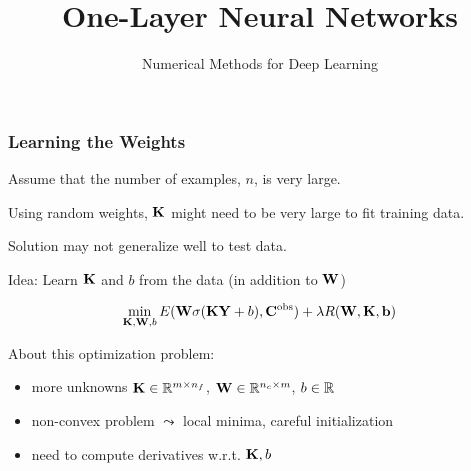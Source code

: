 \documentclass[12pt,fleqn,handout]{beamer}
\title{ One-Layer Neural Networks}
\subtitle{Numerical Methods for Deep Learning}
\date{
}
\begin{document}
\makebeamertitle



\begin{frame}[fragile]\frametitle{Learning the Weights}

Assume that the number of examples, $n$, is very large.

Using random weights, ${\bf K}$ might need to be very large to fit training data.

Solution may not generalize well to test data.

\bigskip
\pause

Idea: Learn ${\bf K}$ and $b$  from the data (in addition to ${\bf W}$)

$$ \min_{{\bf K},{\bf W},b} E({\bf W}\sigma({\bf K} {\bf Y} + b), {\bf C}^{\rm obs}) + \lambda R({\bf W},{\bf K},{\bf b})$$

About this optimization problem:
\begin{itemize}
	\item more unknowns ${\bf K} \in \mathbb{R}^{m \times n_f}$, ${\bf W} \in \mathbb{R}^{n_c \times m}$, $b \in \mathbb{R}$
	\item  non-convex problem $\leadsto$ local minima, careful initialization
	\item need to compute derivatives w.r.t. ${\bf K}, b$
\end{itemize}


\end{frame}
\end{document}
